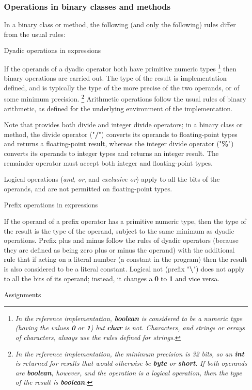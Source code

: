 \subsubsection{Operations in binary classes and methods}\label{refbindif}
 
In a binary class or method, the following (and only the following)
rules differ from the usual rules:
\begin{description}
\item{Dyadic operations in expressions}
 
If the operands of a dyadic operator both have primitive numeric types
\footnote{
\emph{In the reference implementation, \textbf{boolean} is considered to
be a numeric type (having the values \textbf{0} or \textbf{1})
but \textbf{char} is not.
Characters, and strings or arrays of characters, always use the rules
defined for \nr{} strings.}
}
then binary operations are carried out.  The type of the result is
implementation defined, and is typically the type of the more precise of
the two operands, or of some minimum precision.
\footnote{
\emph{In the reference implementation, the minimum precision is 32 bits,
so an \textbf{int} is returned for results that would otherwise
be \textbf{byte} or \textbf{short}.
If both operands are \textbf{boolean}, however, and the operation is a
logical operation, then the type of the result
is \textbf{boolean}.}
}
Arithmetic operations follow the usual rules of binary arithmetic, as
defined for the underlying environment of the implementation.
 
Note that \nr{} provides both divide and integer divide operators; in
a binary class or method, the divide operator ("\textbf{/}")
converts its operands to floating-point types and returns a
floating-point result, whereas the integer divide operator
("\textbf{\%}") converts its operands to integer types and
returns an integer result.
The remainder operator must accept both integer and floating-point
types.
 
Logical operations (\emph{and}, \emph{or}, and \emph{exclusive
or}) apply to all the bits of the operands, and are not permitted
on floating-point types.
\item{Prefix operations in expressions}
 
If the operand of a prefix operator has a primitive numeric type, then
the type of the result is the type of the operand, subject to
the same minimum as dyadic operations.
Prefix plus and minus follow the rules of dyadic operators (because they
are defined as being zero plus or minus the operand) with the additional
rule that if acting on a literal number (a constant in the program) then
the result is also considered to be a literal constant.
Logical not (prefix "\textbf{\textbackslash }") does not apply to all
the bits of its operand; instead, it changes a \textbf{0}
to \textbf{1} and vice versa.
\item{Assignments}
 

\end{description}
